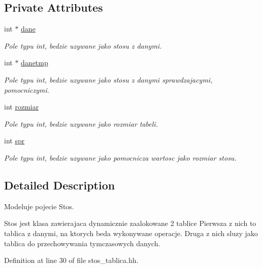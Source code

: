 \subsection*{Private Attributes}
\begin{DoxyCompactItemize}
\item 
int $\ast$ \hyperlink{classstos__tablica_a008b0f69384d5d987782c2f24fcbd387}{dane}
\begin{DoxyCompactList}\small\item\em Pole typu int, bedzie uzywane jako stosu z danymi. \end{DoxyCompactList}\item 
int $\ast$ \hyperlink{classstos__tablica_a2ee83414df31c2f56383199a5d47c755}{danetmp}
\begin{DoxyCompactList}\small\item\em Pole typu int, bedzie uzywane jako stosu z danymi sprawdzajacymi, pomocniczymi. \end{DoxyCompactList}\item 
int \hyperlink{classstos__tablica_aa9c1d33bd477174602d2632c74ebea9c}{rozmiar}
\begin{DoxyCompactList}\small\item\em Pole typu int, bedzie uzywane jako rozmiar tabeli. \end{DoxyCompactList}\item 
int \hyperlink{classstos__tablica_a3575eee2f84a127c96e420770605659e}{spr}
\begin{DoxyCompactList}\small\item\em Pole typu int, bedzie uzywane jako pomocnicza wartosc jako rozmiar stosu. \end{DoxyCompactList}\end{DoxyCompactItemize}


\subsection{Detailed Description}
Modeluje pojecie Stos. 

Stos jest klasa zawierajaca dynamicznie zaalokowane 2 tablice Pierwsza z nich to tablica z danymi, na ktorych beda wykonywane operacje. Druga z nich sluzy jako tablica do przechowywania tymczasowych danych. 

Definition at line 30 of file stos\-\_\-tablica.\-hh.




